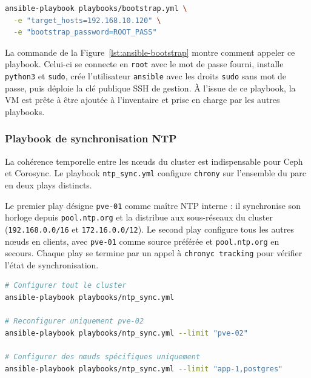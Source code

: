 \begin{lstlisting}[style=sonacode,language=bash,caption={Exemple d'utilisation du playbook
bootstrap.yml},label={lst:ansible-bootstrap}]
ansible-playbook playbooks/bootstrap.yml \
  -e "target_hosts=192.168.10.120" \
  -e "bootstrap_password=ROOT_PASS"
\end{lstlisting}

\par La commande de la Figure~\ref{lst:ansible-bootstrap} montre comment appeler ce playbook. Celui-ci se connecte en \texttt{root} avec le mot de passe fourni, installe \texttt{python3} et \texttt{sudo}, crée l'utilisateur
\texttt{ansible} avec les droits \texttt{sudo} sans mot de passe, puis déploie la clé publique SSH de gestion. À l'issue de ce
playbook, la VM est prête à être ajoutée à l'inventaire et prise en charge par les autres playbooks.\\

\subsubsection{Playbook de synchronisation NTP}

\par La cohérence temporelle entre les nœuds du cluster est indispensable pour Ceph et Corosync. Le playbook \texttt{ntp\_sync.yml}
configure \texttt{chrony} sur l'ensemble du parc en deux plays distincts.\\

\par Le premier play désigne \texttt{pve-01} comme maître NTP interne : il synchronise son horloge depuis \texttt{pool.ntp.org} et
la distribue aux sous-réseaux du cluster (\texttt{192.168.0.0/16} et \texttt{172.16.0.0/12}). Le second play configure tous les
autres nœuds en clients, avec \texttt{pve-01} comme source préférée et \texttt{pool.ntp.org} en secours. Chaque play se termine par
un appel à \texttt{chronyc tracking} pour vérifier l'état de synchronisation.\\

\begin{lstlisting}[style=sonacode,language=bash,caption={Exemples d'utilisation du playbook ntp\_sync.yml},label={lst:ansible-ntp}]
# Configurer tout le cluster
ansible-playbook playbooks/ntp_sync.yml

# Reconfigurer uniquement pve-02
ansible-playbook playbooks/ntp_sync.yml --limit "pve-02"

# Configurer des nœuds spécifiques uniquement
ansible-playbook playbooks/ntp_sync.yml --limit "app-1,postgres"
\end{lstlisting}

